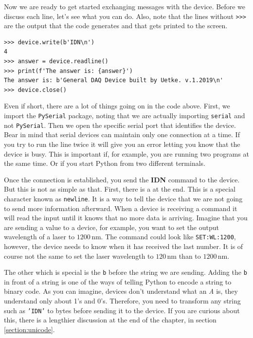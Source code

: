 Now we are ready to get started exchanging messages with the device. Before we discuss each line, let's see what you can do. Also, note that the lines without \texttt{>>>} are the output that the code generates and that gets printed to the screen.

\begin{verbatim}
>>> device.write(b'IDN\n')
4
>>> answer = device.readline()
>>> print(f'The answer is: {answer}')
The answer is: b'General DAQ Device built by Uetke. v.1.2019\n'
>>> device.close()
\end{verbatim}

Even if short, there are a lot of things going on in the code above. First, we import the \texttt{PySerial} package, noting that we are actually importing \texttt{serial} and not \texttt{PySerial}. Then we open the specific serial port that identifies the device. Bear in mind that serial devices can maintain only one connection at a time. If you try to run the line twice it will give you an error letting you know that the device is busy. This is important if, for example, you are running two programs at the same time. Or if you start Python from two different terminals.

Once the connection is established, you send the \textbf{{IDN}} command to the device. But this is not as simple as that. First, there is a \texttt{\n} at the end. This is a special character known as \texttt{newline}. It is a way to tell the device that we are
not going to send more information afterward. When a device is receiving a command it will read the input until it knows that no more data is arriving. Imagine that you are sending a value to a device, for example, you want to set the output wavelength of a laser to $1200\,\textrm{nm}$. The command could look like  \texttt{SET:WL:1200}, however, the device needs to know when it has received the last number. It is of course not the same to set the laser wavelength to $120\,\textrm{nm}$ than to $1200\,\textrm{nm}$.

The other which is special is the \texttt{b} before the string we are sending. Adding the \texttt{b} in front of a string is one of the ways of telling Python to encode a string to binary code. As you can imagine, devices don't understand what an \textit{A} is, they understand only about 1's and 0's. Therefore, you need to transform any string such as \texttt{'IDN'} to bytes before sending it to the device. If you are curious about this, there is a lengthier discussion at the end of the chapter, in section \ref{section:unicode}.

